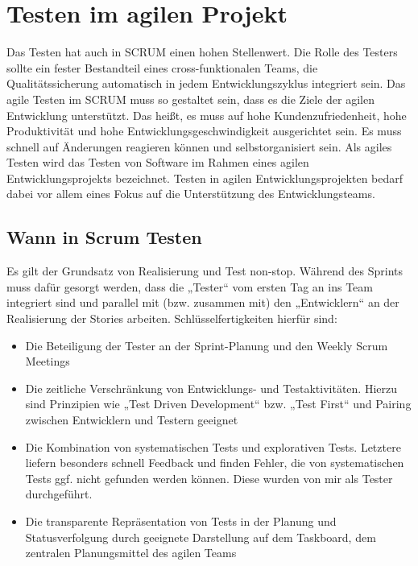 \section{Testen im agilen Projekt}
\label{sec:testen_agil}

Das Testen hat auch in SCRUM einen hohen Stellenwert. Die Rolle des Testers sollte ein fester Bestandteil eines cross-funktionalen Teams, die Qualitätssicherung automatisch in jedem Entwicklungszyklus integriert sein. Das agile Testen im SCRUM muss so gestaltet sein, dass es die Ziele der agilen Entwicklung unterstützt. Das heißt, es muss auf hohe Kundenzufriedenheit, hohe Produktivität und hohe Entwicklungsgeschwindigkeit ausgerichtet sein. Es muss schnell auf Änderungen reagieren können und selbstorganisiert sein.
Als agiles Testen wird das Testen von Software im Rahmen eines agilen Entwicklungsprojekts bezeichnet. Testen in agilen Entwicklungsprojekten bedarf dabei vor allem eines Fokus auf die Unterstützung des Entwicklungsteams.


\subsection{Wann in Scrum Testen}
\label{sub:WannTestenScrum}

Es gilt der Grundsatz von Realisierung und Test non-stop. Während des Sprints muss dafür gesorgt werden, dass die „Tester“ vom ersten Tag an ins Team integriert sind und parallel mit (bzw. zusammen mit) den „Entwicklern“ an der Realisierung der Stories arbeiten. Schlüsselfertigkeiten hierfür sind:

\begin{itemize}
  \item Die Beteiligung der Tester an der Sprint-Planung und den Weekly Scrum Meetings
  \item Die zeitliche Verschränkung von Entwicklungs- und Testaktivitäten. Hierzu sind Prinzipien wie „Test Driven Development“ bzw. „Test First“ und Pairing zwischen Entwicklern und Testern geeignet
  \item Die Kombination von systematischen Tests und explorativen Tests. Letztere liefern besonders schnell Feedback und finden Fehler, die von systematischen Tests ggf. nicht gefunden werden können. Diese wurden von mir als Tester durchgeführt.
  \item Die transparente Repräsentation von Tests in der Planung und Statusverfolgung durch geeignete Darstellung auf dem Taskboard, dem zentralen Planungsmittel des agilen Teams
\end{itemize}

